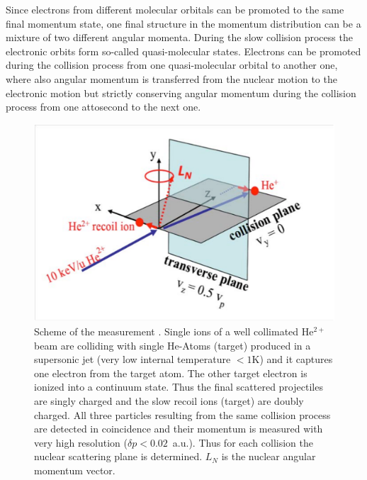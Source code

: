 \documentclass{article}
\begin{document}
Since electrons from different molecular orbitals can be promoted to the same final momentum state, one final structure in the momentum distribution can be a mixture of two different angular momenta. During the slow collision process the electronic orbits form so-called quasi-molecular states. Electrons can be promoted during the collision process from one quasi-molecular orbital to another one, where also angular momentum is transferred from the nuclear motion to the electronic motion but strictly conserving angular momentum during the collision process from one attosecond to the next one. 
%
\begin{figure}
\begin{center}
\includegraphics[scale=0.4]{figures/HeExp_scheme}
\caption{Scheme of the measurement \citep{SchmidtLEtal2014Vortices}. Single ions of a well collimated He$^{2+}$ beam are colliding  with single He-Atoms (target) produced in a supersonic jet (very low internal temperature $< 1$K) and it captures one electron from the target atom. The other target electron is ionized into a continuum state. Thus the final scattered projectiles are singly charged and the slow recoil ions (target) are doubly charged. All three particles resulting from the same collision process are detected in coincidence and their momentum is measured with very high resolution ($\delta p<0.02$~a.u.). Thus for each collision the nuclear scattering plane is  determined. $L_{N}$  is the nuclear angular momentum vector. }
\label{fig:HeExp_scheme}
\end{center}
\end{figure}
%
%
\end{document}
